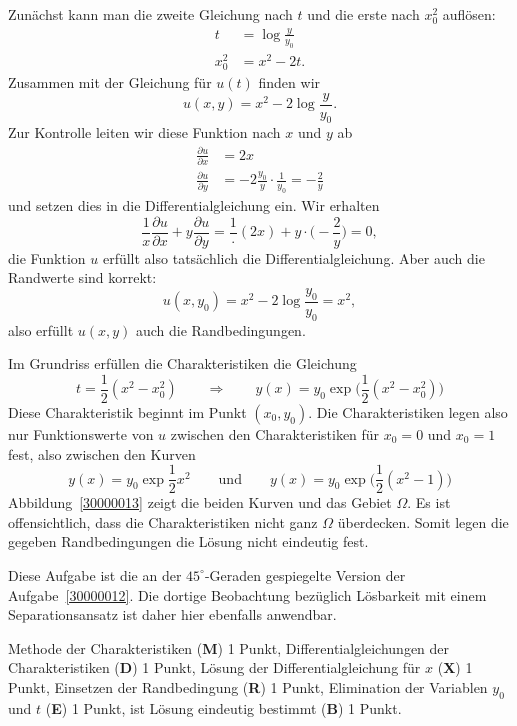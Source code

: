 \begin{loesung}
\begin{teilaufgaben}
Zunächst kann man die zweite Gleichung nach $t$ und die erste nach $x_0^2$
auflösen: 
\begin{align*}
t&=\log\frac{y}{y_0}\\
x_0^2&=x^2-2t.
\end{align*}
Zusammen mit der Gleichung für $u(t)$ finden wir
\[
u(x,y) = x^2 - 2\log\frac{y}{y_0}.
\]
Zur Kontrolle leiten wir diese Funktion nach $x$ und $y$ ab
\begin{align*}
\frac{\partial u}{\partial x}
&=
2x
\\
\frac{\partial u}{\partial y}
&=
-2\frac{y_0}{y}\cdot\frac1{y_0}=-\frac2y
\end{align*}
und setzen dies in die Differentialgleichung ein.
Wir erhalten
\[
\frac1x\frac{\partial u}{\partial x} + y\frac{\partial u}{\partial y}
=
\frac1\cdot (2x)
+
y\cdot \biggl(-\frac{2}{y}\biggr)
=
0,
\]
die Funktion $u$ erfüllt also tatsächlich die Differentialgleichung.
Aber auch die Randwerte sind korrekt:
\[
u(x, y_0)=x^2-2\log\frac{y_0}{y_0}=x^2,
\]
also erfüllt $u(x,y)$ auch die Randbedingungen.
\item
Im Grundriss erfüllen die Charakteristiken die Gleichung
\[
t = \frac12 (x^2-x_0^2)
\qquad\Rightarrow\qquad
y(x)=y_0\exp\biggl(\frac12 (x^2-x_0^2)\biggr)
\]
Diese Charakteristik beginnt im Punkt $(x_0,y_0)$.
Die Charakteristiken legen also nur Funktionswerte von $u$ zwischen
den Charakteristiken für $x_0=0$ und $x_0=1$ fest, also zwischen den Kurven
\[
y(x) = y_0\exp\frac12 x^2
\qquad\text{und}\qquad
y(x) = y_0\exp\biggl(\frac12 (x^2-1)\biggr)
\]
Abbildung~\ref{30000013} zeigt die beiden Kurven und das Gebiet $\Omega$.
Es ist offensichtlich, dass die Charakteristiken nicht ganz $\Omega$
überdecken.
Somit legen die gegeben Randbedingungen die Lösung nicht eindeutig fest.
\qedhere
\end{teilaufgaben}
\end{loesung}

\begin{diskussion}
Diese Aufgabe ist die an der $45^\circ$-Geraden gespiegelte Version der
Aufgabe~\ref{30000012}.
Die dortige Beobachtung bezüglich Lösbarkeit mit einem Separationsansatz ist
daher hier ebenfalls anwendbar.
\end{diskussion}

\begin{bewertung}
Methode der Charakteristiken ({\bf M}) 1 Punkt,
Differentialgleichungen der Charakteristiken ({\bf D}) 1 Punkt,
Lösung der Differentialgleichung für $x$ ({\bf X}) 1 Punkt,
Einsetzen der Randbedingung ({\bf R}) 1 Punkt,
Elimination der Variablen $y_0$ und $t$ ({\bf E}) 1 Punkt,
ist Lösung eindeutig bestimmt ({\bf B}) 1 Punkt.
\end{bewertung}
